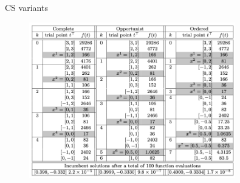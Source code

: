 \documentclass[8pt]{beamer}
\begin{document}
\begin{frame}{CS variants}
  \begin{figure}[H]
    \includegraphics[width=0.8\textwidth]{Figures/CS_variants.png}
  \end{figure} 
\end{frame}
\end{document}
